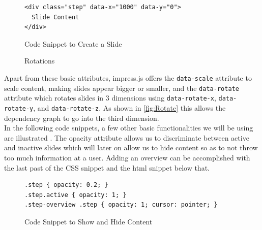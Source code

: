 \documentclass[twoside, 12pt]{article}
\begin{document}
\begin{figure}
\vspace{-26pt}
\begin{verbatim}
<div class="step" data-x="1000" data-y="0">
  Slide Content
</div>
\end{verbatim}
\vspace{-8pt}
  \caption{Code Snippet to Create a Slide}
  \label{fig:SSlide}
  \vspace{12pt}
\end{figure}

\begin{figure}
\vspace{-26pt}
  \begin{center}
  \end{center}
\vspace{-20pt}
  \caption{Rotations \cite{Rotations:npentrel14}}
  \label{fig:Rotate}
\vspace{-10pt}
\end{figure}

Apart from these basic attributes, impress.js offers the \texttt{data-scale} attribute to scale content, making slides appear bigger or smaller, and the \texttt{data-rotate} attribute which rotates slides in 3 dimensions using \texttt{data-rotate-x}, \texttt{data-rotate-y}, and \texttt{data-rotate-z}. As shown in \autoref{fig:Rotate} this allows the dependency graph to go into the third dimension.\\

In the following code snippets, a few other basic functionalities we will be using are illustrated \cite{andismith:npentrel15}. The opacity attribute allows us to discriminate between active and inactive slides which will later on allow us to hide content so as to not throw too much information at a user. Adding an overview can be accomplished with the last past of the CSS snippet and the html snippet below that.

\begin{figure}
\vspace{0pt}
\begin{verbatim}
.step { opacity: 0.2; }
.step.active { opacity: 1; }
.step-overview .step { opacity: 1; cursor: pointer; }
\end{verbatim}
\vspace{-8pt}
  \caption{Code Snippet to Show and Hide Content}
  \label{fig:SSlide}
  \vspace{20pt}
\end{figure}
\end{document}
